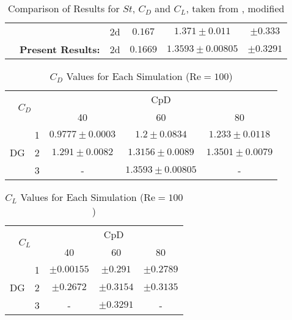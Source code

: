 \begin{table}[H]
\begin{tabular}{|l|p{4cm}|c|c|c|c|}
		\rule{0pt}{2,3ex}& \textcite{ayers}                  & \gls{2d}    &$ 0.167$     & $1.371 \pm 0.011 $ &$ \pm 0.333 $\\ \cline{2-6} 
		\rule{0pt}{2,3ex}& \textbf{Present Results:}                   & \gls{2d}    & $0.1669$     & $1.3593 \pm 0.00805$  &  $\pm 0.3291$ \\ \hline
	\end{tabular}	
	\caption{Comparison of Results for $St$, $C_D$ and $C_L$, taken from \cite{ayers}, modified}
	\label{table100}
\end{table}



\begin{table}[H]
	\centering
	\def\arraystretch{1.5}
	\begin{tabular}{|c|c|c|c|c|}
		\hline
		\multicolumn{2}{|c|}{\multirow{2}{*}{$C_D$}} & \multicolumn{3}{c|}{CpD} \\ \cline{3-5} 
		\multicolumn{2}{|c|}{}                       & 40     & 60    & 80    \\ \hline
		\multirow{3}{*}{DG}            & 1           &   $0.9777\pm 0.0003$     &     $1.2 \pm 0.0834$  &     $1.233 \pm 0.0118$   \\ \cline{2-5} 
		& 2           &     $1.291 \pm 0.0082$   &   $1.3156 \pm 0.0089$    &     $1.3501 \pm 0.0079$   \\ \cline{2-5} 
		& 3           &      -  &     $1.3593 \pm 0.00805$   &     -   \\ \hline
	\end{tabular}
	\caption[$C_D$ Values for Each simulation]{$C_D$ Values for Each Simulation ($\text{Re} = 100$)}	
	\label{C_D100}
\end{table}
\begin{table}[H]
	\centering
	\def\arraystretch{1.5}
	\begin{tabular}{|c|c|c|c|c|}
		\hline
		\multicolumn{2}{|c|}{\multirow{2}{*}{$C_L$}} & \multicolumn{3}{c|}{CpD} \\ \cline{3-5} 
		\multicolumn{2}{|c|}{}                       & 40     & 60    & 80    \\ \hline
		\multirow{3}{*}{DG}            & 1           &    $\pm 0.00155$    &    $\pm 0.291$   &    $\pm 0.2789$    \\ \cline{2-5} 
		& 2           &     $\pm 0.2672$   &    $\pm 0.3154$   &     $\pm 0.3135$   \\ \cline{2-5} 
		& 3           &     -   &    $\pm 0.3291$  &    -    \\ \hline
	\end{tabular}
	\caption{$C_L$ Values for Each Simulation ($\text{Re} = 100$)}	
	\label{CL100}
\end{table}
